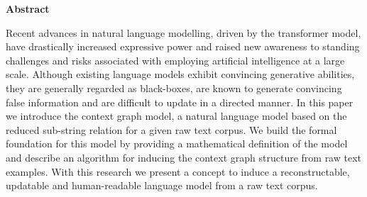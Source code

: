 \thispagestyle{empty}


\vspace*{\fill}
\begin{center}
\bf{Abstract}
\end{center}


\noindent
Recent advances in natural language modelling, driven by the transformer model, have drastically increased expressive power and raised new awareness to standing challenges and risks associated with employing artificial intelligence at a large scale. Although existing language models exhibit convincing generative abilities, they are generally regarded as black-boxes, are known to generate convincing false information and are difficult to update in a directed manner. In this paper we introduce the context graph model, a natural language model based on the reduced sub-string relation for a given raw text corpus. We build the formal foundation for this model by providing a mathematical definition of the model and describe an algorithm for inducing the context graph structure from raw text examples. With this research we present a concept to induce a reconstructable, updatable and human-readable language model from a raw text corpus.

\vspace*{\fill}

